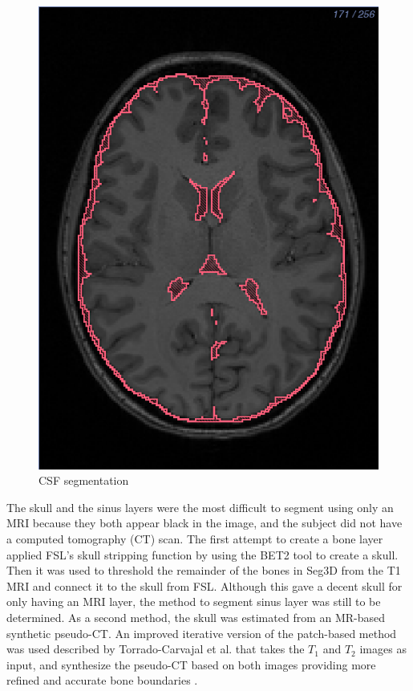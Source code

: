 \begin{figure}[H]
\begin{center}
\includegraphics[width=.49\textwidth]{Figures/CSF_seg}
\caption{CSF segmentation}
\label{fig:csf}
\end{center}
\end{figure}

The skull and the sinus layers were the most difficult to segment using only an MRI because they both appear black in the image, and the subject did not have a computed tomography (CT) scan. The first attempt to create a bone layer applied FSL's skull stripping function by using the BET2 tool to create a skull. Then it was used to threshold the remainder of the bones in Seg3D from the T1 MRI and connect it to the skull from FSL. Although this gave a decent skull for only having an MRI layer, the method to segment sinus layer was still to be determined. As a second method, the skull was estimated from an MR-based synthetic pseudo-CT. An improved iterative version of the patch-based method was used described by Torrado-Carvajal et al. that takes the $T_1$ and $T_2$ images as input, and synthesize the pseudo-CT based on both images providing more refined and accurate bone boundaries \cite{ref:pseudoct}. 

